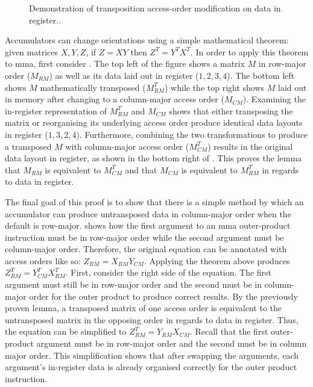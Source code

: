 \documentclass[\main/thesis.tex]{subfiles}
\begin{document}
\begin{figure}[t]
  \caption[Effects of Transposition and Access-Order Modification]{Demonstration of transposition access-order modification on data in register..}
  \label{fig:orderAndTranspose}
\end{figure}

Accumulators can change orientations using a simple mathematical theorem: given matrices $X, Y, Z$, if $Z = XY$ then $Z^T=Y^TX^T$.
In order to apply this theorem to \gls{mma}, first consider .
The top left of the figure shows a matrix $M$ in row-major order ($M_{RM}$) as well as its data laid out in register ($1, 2, 3, 4$).
The bottom left shows $M$ mathematically transposed ($M_{RM}^T$) while the top right shows $M$ laid out in memory after changing to a column-major access order ($M_{CM}$).
Examining the in-register representation of $M_{RM}^T$ and $M_{CM}$ shows that either transposing the matrix or reorganising its underlying access order produce identical data layouts in register ($1, 3, 2, 4$).
Furthermore, combining the two transformations to produce a transposed $M$ with column-major access order ($M_{CM}^T$) results in the original data layout in register, as shown in the bottom right of .
This proves the lemma that $M_{RM}$ is equivalent to $M^T_{CM}$ and that $M_{CM}$ is equivalent to $M^T_{RM}$ in regards to data in register.

The final goal of this proof is to show that there is a simple method by which an accumulator can produce untransposed data in column-major order when the default is row-major.
 shows how the first argument to an \gls{mma} outer-product instruction must be in row-major order while the second argument must be column-major order.
Therefore, the original equation can be annotated with access orders like so: $Z_{RM} = X_{RM} Y_{CM}$.
Applying the theorem above produces $Z^T_{RM} = Y^T_{CM} X^T_{RM}$.
First, consider the right side of the equation.
The first argument must still be in row-major order and the second must be in column-major order for the outer product to produce correct results.
By the previously proven lemma, a transposed matrix of one access order is equivalent to the untransposed matrix in the opposing order in regards to data in register.
Thus, the equation can be simplified to $Z^T_{RM} = Y_{RM}X_{CM}$.
Recall that the first outer-product argument must be in row-major order and the second must be in column major order.
This simplification shows that after swapping the arguments, each argument's in-register data is already organised correctly for the outer product instruction.
\end{document}
